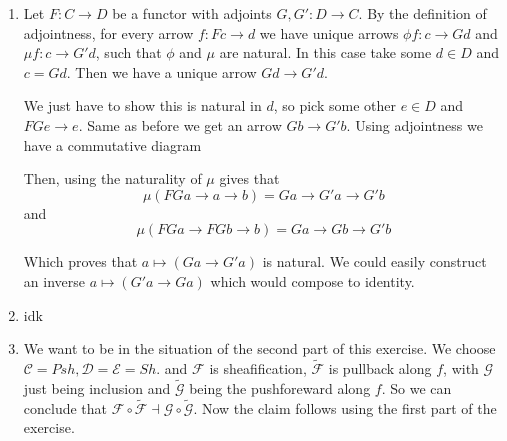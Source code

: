 \begin{exercise}{4}
    \begin{enumerate}
        \item{Let $F \colon C \rightarrow D$ be a functor with adjoints $G, G'
            \colon D \rightarrow C$. By the definition of adjointness, for every
            arrow $f \colon Fc \rightarrow d$ we have unique arrows $\phi f
            \colon c \rightarrow Gd$ and $\mu f \colon c \rightarrow G'd$, such
            that $\phi$ and $\mu$ are natural. In this case take some $d \in D$
            and $c = Gd$. Then we have a unique arrow $Gd \rightarrow G'd$.

            We just have to show this is natural in $d$, so pick some other $e
            \in D$ and $FGe \rightarrow e$. Same as before we get an arrow $Gb
            \rightarrow G'b$. Using adjointness we have a commutative diagram


            Then, using the naturality of $\mu$ gives that
            \begin{equation*}
                \mu(FGa \rightarrow a \rightarrow b) = Ga \rightarrow G'a
                \rightarrow G'b
            \end{equation*}
            and
            \begin{equation*}
                \mu(FGa \rightarrow FGb \rightarrow b) = Ga \rightarrow Gb
                \rightarrow G'b
            \end{equation*}

            Which proves that $a \mapsto (Ga \rightarrow G'a)$ is natural.
            We could easily construct an inverse $a \mapsto (G'a \rightarrow
            Ga)$ which would compose to identity.}
            \item{
                idk
            }
    \item{We want to be in the situation of the second part of
         this exercise. We choose $\mathcal{C}=Psh, \mathcal{D}=\mathcal{E}=Sh$.
         and $\mathcal{F}$ is sheafification, $\mathcal{\tilde{F}}$ is pullback
         along $f$, with $\mathcal{G}$ just being inclusion and $\tilde{\mathcal{G}}$
         being the pushforeward
         along $f$. So we can conclude that 
         $\mathcal{F}\circ \mathcal{\tilde{F}}\dashv \mathcal{G}\circ \mathcal{\tilde{G}}$.
         Now the claim follows using the first part of the exercise.
        }
    \end{enumerate}
\end{exercise}


